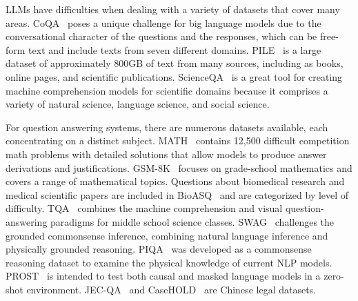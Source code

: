 \documentclass{article}
\begin{document}
{	LLMs have difficulties when dealing with a variety of datasets that cover many areas. CoQA~\cite{reddy2019coqa} poses a unique challenge for big language models due to the conversational character of the questions and the responses, which can be free-form text and include texts from seven different domains. PILE~\cite{gao2020pile} is a large dataset of approximately 800GB of text from many sources, including as books, online pages, and scientific publications. ScienceQA~\cite{lu2022learn} is a great tool for creating machine comprehension models for scientific domains because it comprises a variety of natural science, language science, and social science.
	
	For question answering systems, there are numerous datasets available, each concentrating on a distinct subject.  MATH~\cite{hendrycks2021measuring} contains 12,500 difficult competition math problems with detailed solutions that allow models to produce answer derivations and justifications. GSM-8K~\cite{cobbe2021training} focuses on grade-school mathematics and covers a range of mathematical topics. Questions about biomedical research and medical scientific papers are included in BioASQ~\cite{tsatsaronis2015overview} and are categorized by level of difficulty. TQA~\cite{kembhavi2017you} combines the machine comprehension and visual question-answering paradigms for middle school science classes. SWAG~\cite{zellers2018swag} challenges the grounded commonsense inference, combining natural language inference and physically grounded reasoning. PIQA~\cite{bisk2020piqa} was developed as a commonsense reasoning dataset to examine the physical knowledge of current NLP models. PROST~\cite{aroca2021prost} is intended to test both causal and masked language models in a zero-shot environment. JEC-QA~\cite{zhong2020jec} and CaseHOLD~\cite{zheng2021does} are Chinese legal datasets. 
	
}
\end{document}
